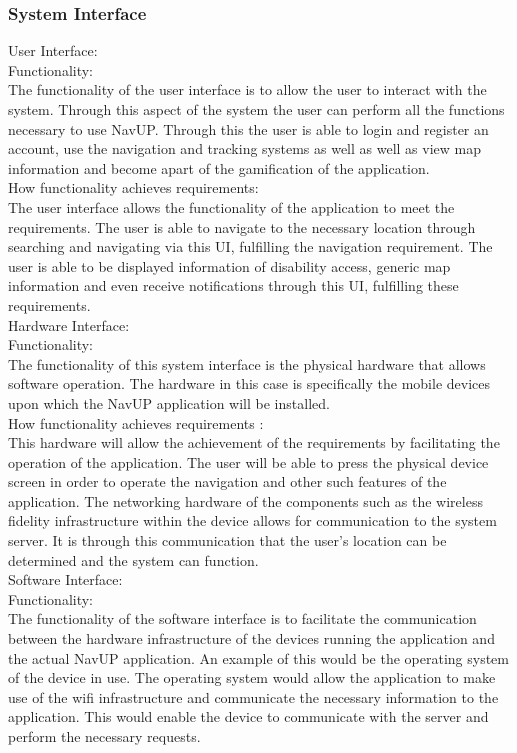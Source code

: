 \documentclass{article}
\begin{document}
        	\subsubsection{System Interface}{
User Interface:\\
Functionality:\\
The functionality of the user interface is to allow the user to interact with the system. Through this aspect of the system the user can perform all the functions necessary to use NavUP. Through this the user is able to login and register an account, use the navigation and tracking systems as well as well as view map information and become apart of the gamification of the application.\\
How functionality achieves requirements:\\
The user interface allows the functionality of the application to meet the requirements. The user is able to navigate to the necessary location through searching and navigating via this UI, fulfilling the navigation requirement. The user is able to be displayed information of disability access, generic map information and even receive notifications through this UI, fulfilling these requirements.\\
Hardware Interface:\\
Functionality:\\
The functionality of this system interface is the physical hardware that allows software operation. The hardware in this case is specifically the mobile devices upon which the NavUP application will be installed.\\
How functionality achieves requirements :\\
This hardware will allow the achievement of the requirements by facilitating the operation of the application. The user will be able to press the physical device screen in order to operate the navigation and other such features of the application. The networking hardware of the components such as the wireless fidelity infrastructure within the device allows for communication to the system server. It is through this communication that the user's location can be determined and the system can function.\\
Software Interface:\\
Functionality:\\
The functionality of the software interface is to facilitate the communication between the hardware infrastructure of the devices running the application and the actual NavUP application. An example of this would be the operating system of the device in use. The operating system would allow the application to make use of the wifi infrastructure and communicate the necessary information to the application. This would enable the device to communicate with the server and perform the necessary requests.\\
}
\end{document}
